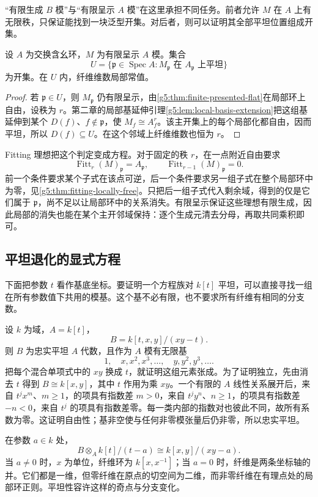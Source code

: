 “有限生成 \(B\) 模”与“有限呈示 \(A\) 模”在这里承担不同任务。前者允许 \(M\) 在 \(A\) 上有无限秩，只保证能找到一块泛型开集。对后者，则可以证明其全部平坦位置组成开集。

\begin{proposition}\label{g5:prop:finite-module-flat-locus}
	设 \(A\) 为交换含幺环，\(M\) 为有限呈示 \(A\) 模。集合
	\[
		U=\{\mathfrak p\in\operatorname{Spec}A:
		M_{\mathfrak p}\text{ 在 }A_{\mathfrak p}\text{ 上平坦}\}
	\]
	为开集。在 \(U\) 内，纤维维数局部常值。
\end{proposition}
\begin{proof}
	若 \(\mathfrak p\in U\)，则 \(M_{\mathfrak p}\) 仍有限呈示，由\cref{g5:thm:finite-presented-flat}在局部环上自由，设秩为 \(r\)。第二章的局部基延伸引理\cref{g5:lem:local-basis-extension}把这组基延伸到某个 \(D(f)\)、\(f\notin\mathfrak p\)，使 \(M_f\cong A_f^r\)。该主开集上的每个局部化都自由，因而平坦，所以 \(D(f)\subseteq U\)。在这个邻域上纤维维数也恒为 \(r\)。
\end{proof}

Fitting 理想把这个判定变成方程。对于固定的秩 \(r\)，在一点附近自由要求
\[
	\operatorname{Fitt}_r(M)_{\mathfrak p}=A_{\mathfrak p},
	\qquad
	\operatorname{Fitt}_{r-1}(M)_{\mathfrak p}=0.
\]
前一个条件要求某个子式在该点可逆，后一个条件要求另一组子式在整个局部环中为零，见\cref{g5:thm:fitting-locally-free}。只把后一组子式代入剩余域，得到的仅是它们属于 \(\mathfrak p\)，尚不足以让局部环中的关系消失。有限呈示保证这些理想有限生成，因此局部的消失也能在某个主开邻域保持：逐个生成元清去分母，再取共同乘积即可。

\subsection{平坦退化的显式方程}
\label{g5:subsec:0604:04}

下面把参数 \(t\) 看作基底坐标。要证明一个方程族对 \(k[t]\) 平坦，可以直接寻找一组在所有参数值下共用的模基。这个基不必有限，也不要求所有纤维有相同的分支数。

\begin{example}\label{g5:exm:flat-node-family}
	设 \(k\) 为域，\(A=k[t]\)，
	\[
		B=k[t,x,y]/(xy-t).
	\]
	则 \(B\) 为忠实平坦 \(A\) 代数，且作为 \(A\) 模有无限基
	\[
		1,\quad x,x^2,x^3,\ldots,\quad y,y^2,y^3,\ldots.
	\]
	把每个混合单项式中的 \(xy\) 换成 \(t\)，就证明这组元素张成。为了证明独立，先由消去 \(t\) 得到 \(B\cong k[x,y]\)，其中 \(t\) 作用为乘 \(xy\)。一个有限的 \(A\) 线性关系展开后，来自 \(t^j x^m\)、\(m\geq1\)，的项具有指数差 \(m>0\)，来自 \(t^j y^n\)、\(n\geq1\)，的项具有指数差 \(-n<0\)，来自 \(t^j\) 的项具有指数差零。每一类内部的指数对也彼此不同，故所有系数为零。这证明自由性；基非空使与任何非零模张量后仍非零，所以忠实平坦。

	在参数 \(a\in k\) 处，
	\[
		B\otimes_A k[t]/(t-a)\cong k[x,y]/(xy-a).
	\]
	当 \(a\ne0\) 时，\(x\) 为单位，纤维环为 \(k[x,x^{-1}]\)；当 \(a=0\) 时，纤维是两条坐标轴的并。它们都是一维，但零纤维在原点的切空间为二维，而非零纤维在有理点处的局部环正则。平坦性容许这样的奇点与分支变化。
\end{example}

